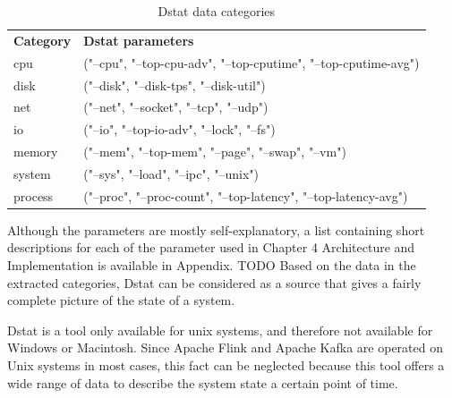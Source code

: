 \begin{table}[H]
    \begin{tabular}{ll}
        \textbf{Category} & \textbf{Dstat parameters} \\
        cpu & ("--cpu", "--top-cpu-adv", "--top-cputime", "--top-cputime-avg")\\
        disk & ("--disk", "--disk-tps", "--disk-util")\\
        net & ("--net", "--socket", "--tcp", "--udp")\\
        io & ("--io", "--top-io-adv", "--lock", "--fs")\\
        memory & ("--mem", "--top-mem", "--page", "--swap", "--vm")\\
        system & ("--sys", "--load", "--ipc", "--unix")\\
        process & ("--proc", "--proc-count", "--top-latency", "--top-latency-avg")\\
    \end{tabular}
    \caption{Dstat data categories}
    \label{tbl:dstatcategories}
\end{table}

Although the parameters are mostly self-explanatory, a list containing short descriptions
for each of the parameter used in Chapter 4 Architecture and Implementation is available in
Appendix. TODO Based on the data in the extracted categories, Dstat can be considered
as a source that gives a fairly complete picture of the state of a system.

Dstat is a tool only available for unix systems, and therefore not available for Windows or
Macintosh. Since Apache Flink and Apache Kafka are operated on Unix systems in most
cases, this fact can be neglected because this tool offers a wide range of data to describe
the system state a certain point of time.


